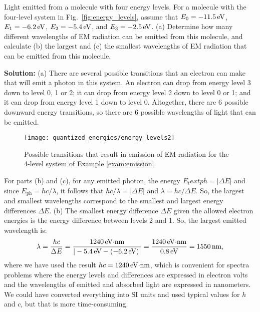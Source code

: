 \begin{example}{Light emitted from a molecule with four energy levels.}
\label{exam:emission}
For a molecule with the four-level system in Fig.~\ref{fig:energy_levels}, 
assume that $E_0 = -11.5\,\mbox{eV}$, $E_1=-6.2\,\mbox{eV}$, 
$E_2 = -5.4\,\mbox{eV}$, and $E_3 = -2.5\,\mbox{eV}$. 
(a) Determine how many different wavelengths of EM
radiation can be emitted from this molecule, and calculate (b) the 
largest and (c) the smallest wavelengths of
EM radiation that can be emitted from this molecule.

{\bf Solution:} (a) There are several possible transitions that an 
electron can make that will emit a photon in this system. An electron
can drop from energy level 3 down to level 0, 1 or 2; it can drop
from energy level 2 down to level 0 or 1; and it can drop from
energy level 1 down to level 0. Altogether, there are 6 possible
downward energy transitions, so there are 6 possible wavelengths of
light that can be emitted. 

\begin{figure}[!t]
\begin{center}
\texttt{[image: quantized\_energies/energy\_levels2]}
\end{center}
\caption{Possible transitions that result in emission of EM radiation
for the 4-level system of Example \ref{exam:emission}.}
\label{fig:energy_levels2}
\end{figure}
For parts (b) and (c), for any emitted photon, the energy 
$E_text{ph} = |\Delta E|$ and since $E_\text{ph} = hc/\lambda$, 
it follows that $hc/\lambda = |\Delta E|$ and
$\lambda = hc/\Delta E$. So, the largest and smallest wavelengths
correspond to the smallest and largest energy differences $\Delta E$.
(b) The smallest energy difference $\Delta E$ given the allowed electron
energies is the energy difference between levels 2 and 1. So, the largest
emitted wavelength is:
\begin{equation}
\lambda = \frac{hc}{\Delta E} 
        = \frac{1240 \,\mbox{eV$\cdot$nm}}{|-5.4 \,\mbox{eV} 
               - (-6.2 \,\mbox{eV})|} 
        = \frac{1240 \,\mbox{eV$\cdot$nm}}{0.8 \,\mbox{eV}} = 1550 \,\mbox{nm}, 
\end{equation}
where we have used the result $hc = 1240\,\mbox{eV$\cdot$nm}$, 
which is convenient for 
spectra problems where the energy levels and differences are expressed
in electron volts and the wavelengths of emitted and absorbed light are 
expressed in nanometers. We could have converted everything into SI units
and used typical values for $h$ and $c$, but that is more time-consuming.


\end{example}
